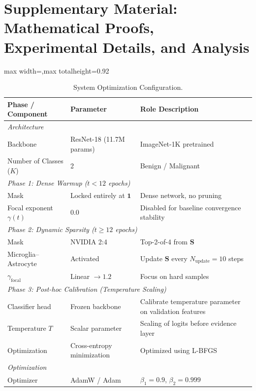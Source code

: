 \documentclass[letterpaper]{article} %
\begin{document}
\appendix
\section{Supplementary Material: Mathematical Proofs, Experimental Details, and Analysis}

\begin{table}[t]
\centering
\caption{System Optimization Configuration.}
\label{tab:config}
\scriptsize
\renewcommand{\arraystretch}{0.9}
\setlength{\tabcolsep}{2.0pt}
\begin{adjustbox}{max width=\columnwidth,max totalheight=0.92\textheight}
\begin{tabular}{@{}p{}p{}p{}@{}}
\toprule
\textbf{Phase / Component} & \textbf{Parameter} & \textbf{Role Description} \\
\midrule
\multicolumn{3}{l}{\emph{Architecture}} \\
Backbone & ResNet-18 (11.7M params) & ImageNet-1K pretrained \\
Number of Classes ($K$) & 2 & Benign / Malignant \\
\midrule
\multicolumn{3}{l}{\emph{Phase 1: Dense Warmup ($t < 12$ epochs)}} \\
Mask & Locked entirely at $\bm{1}$ & Dense network, no pruning \\
Focal exponent $\gamma(t)$ & $0.0$ & Disabled for baseline convergence stability \\
\midrule
\multicolumn{3}{l}{\emph{Phase 2: Dynamic Sparsity ($t \ge 12$ epochs)}} \\
Mask & NVIDIA 2:4 & Top-2-of-4 from $\bm{S}$ \\
Microglia--Astrocyte & Activated & Update $\bm{S}$ every $N_{\text{update}} = 10$ steps \\
$\gamma_{\text{focal}}$ & Linear $\to 1.2$ & Focus on hard samples \\
\midrule
\multicolumn{3}{l}{\emph{Phase 3: Post-hoc Calibration (Temperature Scaling)}} \\
Classifier head & Frozen backbone & Calibrate temperature parameter on validation features \\
Temperature $T$ & Scalar parameter & Scaling of logits before evidence layer \\
Optimization & Cross-entropy minimization & Optimized using L-BFGS \\
\midrule
\multicolumn{3}{l}{\emph{Optimization}} \\
Optimizer & AdamW / Adam~\cite{loshchilov2019decoupled,kingma2015adam} & $\beta_1=0.9$, $\beta_2=0.999$ \\

\end{tabular}
\end{adjustbox}
\end{table}
\end{document}
